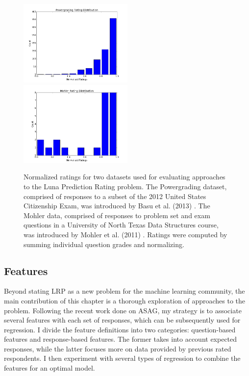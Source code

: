 \begin{figure}[h]
\centerline{%
\includegraphics[width=0.5\textwidth]{figures/powerGradingDistribution.png}%
\includegraphics[width=0.5\textwidth] {figures/mohlerRatings.png}%
}%
\caption{Normalized ratings for two datasets used for evaluating approaches to the Luna Prediction Rating problem. The Powergrading dataset, comprised of responses to a subset of the 2012 United States Citizenship Exam, was introduced by Basu et al. (2013) \cite{basu2013powergrading}. The Mohler data, comprised of responses to problem set and exam questions in a University of North Texas Data Structures course, was introduced by Mohler et al. (2011) \cite{mohler2011learning}. Ratings were computed by summing individual question grades and normalizing.}
\label{fig:RatingDistribution}
\end{figure}

\subsection{Features}

Beyond stating LRP as a new problem for the machine learning community, the main contribution of this chapter is a thorough exploration of approaches to the problem. Following the recent work done on ASAG, my strategy is to associate several features with each set of responses, which can be subsequently used for regression. I divide the feature definitions into two categories: question-based features and response-based features. The former takes into account expected responses, while the latter focuses more on data provided by previous rated respondents. I then experiment with several types of regression to combine the features for an optimal model.


